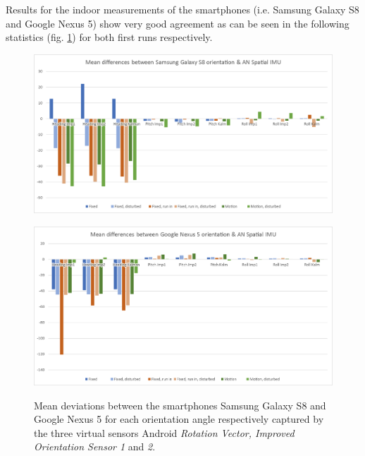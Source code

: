 \documentclass[review]{elsarticle}
\begin{document}
Results for the indoor measurements of the smartphones (i.e. Samsung Galaxy S8 and Google Nexus 5) show very good agreement as can be seen in the following statistics (fig. \ref{fig:sensor_sensi:imu_mean_s8_nex5}) for both first runs respectively.

\begin{figure}[htbp!]
\begin{center}
	 	\begin{minipage}{\columnwidth}
	 		\centering
			\subfigure
			{\includegraphics[keepaspectratio, width=1\columnwidth]{graphics/sensor_mean_imu_s8}\label{fig:sensor_sensi:imu_mean_s8_nex5:s8}}
	 	\end{minipage} 
	 	\begin{minipage}{\columnwidth}
	 		\centering
			\subfigure 
			{\includegraphics[keepaspectratio, width=1\columnwidth]{graphics/sensor_mean_imu_nexus5}\label{fig:sensor_sensi:imu_mean_s8_nex5:nex5}}
	 	\end{minipage}
		
		\caption{Mean deviations between the smartphones Samsung Galaxy S8 and Google Nexus 5 for each orientation angle respectively captured by the three virtual sensors Android \textit{Rotation Vector, Improved Orientation Sensor 1} and \textit{2}. }
		\label{fig:sensor_sensi:imu_mean_s8_nex5}
\end{center}
\end{figure}
\end{document}
